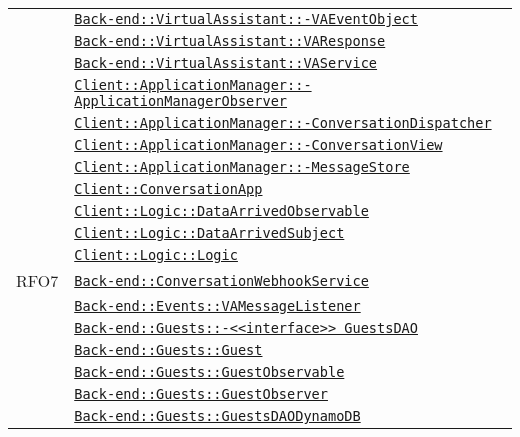 \begin{longtable}{|>{\centering}m{3cm}|m{10cm}<{\centering}|}
& \hyperref[Back-end::VirtualAssistant::VAEventObject]{\texttt{Back-end::VirtualAssistant::-\linebreak VAEventObject}}\\
& \hyperref[Back-end::VirtualAssistant::VAResponse]{\texttt{Back-end::VirtualAssistant::VAResponse}}\\
& \hyperref[Back-end::VirtualAssistant::VAService]{\texttt{Back-end::VirtualAssistant::VAService}}\\
& \hyperref[Client::ApplicationManager::ApplicationManagerObserver]{\texttt{Client::ApplicationManager::-\linebreak ApplicationManagerObserver}}\\
& \hyperref[Client::ApplicationManager::ConversationDispatcher]{\texttt{Client::ApplicationManager::-\linebreak ConversationDispatcher}}\\
& \hyperref[Client::ApplicationManager::ConversationView]{\texttt{Client::ApplicationManager::-\linebreak ConversationView}}\\
& \hyperref[Client::ApplicationManager::MessageStore]{\texttt{Client::ApplicationManager::-\linebreak MessageStore}}\\
& \hyperref[Client::ConversationApp]{\texttt{Client::ConversationApp}}\\
& \hyperref[Client::Logic::DataArrivedObservable]{\texttt{Client::Logic::DataArrivedObservable}}\\
& \hyperref[Client::Logic::DataArrivedSubject]{\texttt{Client::Logic::DataArrivedSubject}}\\
& \hyperref[Client::Logic::Logic]{\texttt{Client::Logic::Logic}}\\ \hline

RFO7 & \hyperref[Back-end::ConversationWebhookService]{\texttt{Back-end::ConversationWebhookService}}\\
& \hyperref[Back-end::Events::VAMessageListener]{\texttt{Back-end::Events::VAMessageListener}}\\
& \hyperref[Back-end::Guests::<<interface>> GuestsDAO]{\texttt{Back-end::Guests::-\linebreak <<interface>> GuestsDAO}}\\
& \hyperref[Back-end::Guests::Guest]{\texttt{Back-end::Guests::Guest}}\\
& \hyperref[Back-end::Guests::GuestObservable]{\texttt{Back-end::Guests::GuestObservable}}\\
& \hyperref[Back-end::Guests::GuestObserver]{\texttt{Back-end::Guests::GuestObserver}}\\
& \hyperref[Back-end::Guests::GuestsDAODynamoDB]{\texttt{Back-end::Guests::GuestsDAODynamoDB}}\\ \hline


\end{longtable}
